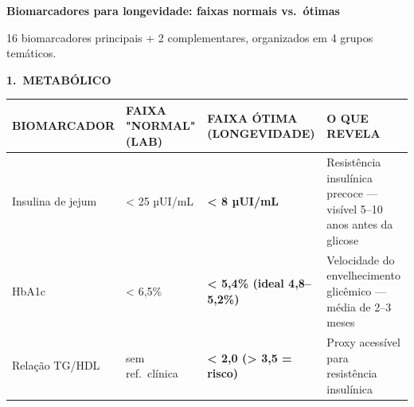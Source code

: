\begingroup
\sffamily

\begin{center}
{\sffamily\bfseries\color{petrol}\normalsize%
Biomarcadores para longevidade: faixas normais vs.\ ótimas\par}
{\sffamily\scriptsize\color{ink}%
16 biomarcadores principais + 2 complementares, organizados em 4 grupos temáticos.\par}
\end{center}

\vspace{0.2em}


\renewcommand{\arraystretch}{1.02}
\setlength{\tabcolsep}{3pt}

\newcommand{\biotabhead}{%
\rowcolor{gray!22}%
{\tiny\textbf{BIOMARCADOR}} &
{\tiny\textbf{FAIXA "NORMAL" (LAB)}} &
{\tiny\textbf{FAIXA ÓTIMA (LONGEVIDADE)}} &
{\tiny\textbf{O QUE REVELA}} \\
\midrule
}

\newcommand{\biotabsection}[2]{%
\vspace{0.25em}\par%
{\sffamily\bfseries\color{petrol}\small #1.\ #2}\par%
\vspace{0.1em}%
}

\biotabsection{1}{METABÓLICO}
{\tiny\noindent
\begin{tabular}{@{}B N O R@{}}
\toprule
\biotabhead
Insulina de jejum & < 25 µUI/mL & \textbf{< 8 µUI/mL} & Resistência insulínica precoce — visível 5--10 anos antes da glicose \\
HbA1c & < 6{,}5\% & \textbf{< 5{,}4\% (ideal 4{,}8--5{,}2\%)} & Velocidade do envelhecimento glicêmico — média de 2--3 meses \\
Relação TG/HDL & sem ref.\ clínica & \textbf{< 2{,}0 (> 3{,}5 = risco)} & Proxy acessível para resistência insulínica \\
\bottomrule
\end{tabular}}

